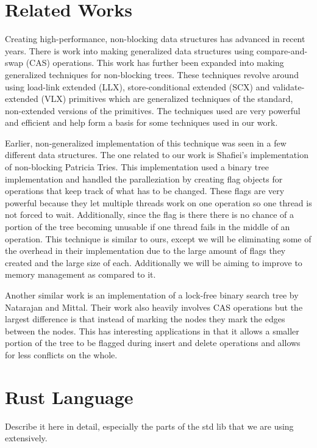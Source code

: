 \documentclass[conference]{IEEEtran}
\begin{document}
\section{Related Works}
Creating high-performance, non-blocking data structures has advanced in recent years. There is work into making generalized data structures using compare-and-swap (CAS) operations. \cite{Brown2013} This work has further been expanded into making generalized techniques for non-blocking trees. \cite{Brown2014} These techniques revolve around using load-link extended (LLX), store-conditional extended (SCX) and validate-extended (VLX) primitives which are generalized techniques of the standard, non-extended versions of the primitives. \cite{Brown2013, Brown2014} The techniques used are very powerful and efficient and help form a basis for some techniques used in our work. \par
Earlier, non-generalized implementation of this technique was seen in a few different data structures. The one related to our work is Shafiei's implementation of non-blocking Patricia Tries. \cite{Shafiei2013} This implementation used a binary tree implementation and handled the paralleziation by creating flag objects for operations that keep track of what has to be changed. These flags are very powerful because they let multiple threads work on one operation so one thread is not forced to wait.  Additionally, since the flag is there there is no chance of a portion of the tree becoming unusable if one thread fails in the middle of an operation. \cite{Shafiei2013, Howley2012} This technique is similar to ours, except we will be eliminating some of the overhead in their implementation due to the large amount of flags they created and the large size of each. Additionally we will be aiming to improve to memory management as compared to it. \par
Another similar work is an implementation of a lock-free binary search tree by Natarajan and Mittal. Their work also heavily involves CAS operations but the largest difference is that instead of marking the nodes they mark the edges between the nodes.\cite{Natarajan2014} This has interesting applications in that it allows a smaller portion of the tree to be flagged during insert and delete operations and allows for less conflicts on the whole.\par

\section{Rust Language}
Describe it here in detail, especially the parts of the std lib that we are using extensively.
\end{document}
